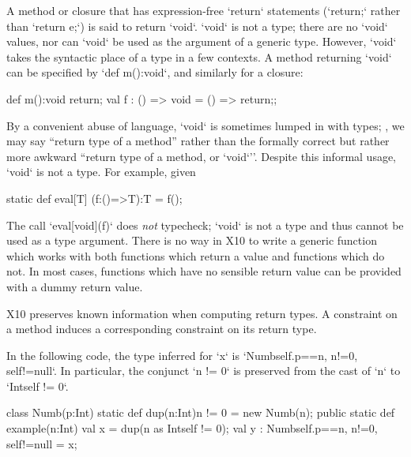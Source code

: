 
A method or closure that has expression-free \xcd`return` statements
(\xcd`return;` rather than \xcd`return e;`) is said to return \xcd`void`.
\xcd`void` is not a type; there are no \xcd`void` values, nor can \xcd`void`
be used as the argument of a generic type. However, \xcd`void` takes the
syntactic place of a type in a few contexts. A method returning \xcd`void` can be specified by
\xcd`def m():void`, and similarly for a closure: 

\begin{xten}
def m():void {return;}
val f : () => void = () => {return;};
\end{xten}

By a convenient abuse of language, \xcd`void` is sometimes
lumped in with types; \eg, we may say ``return type of a method'' rather than
the formally correct but rather more awkward ``return type of a method, or
\xcd`void`''.   Despite this informal usage, \xcd`void` is not a type.  For
example, given 
\begin{xten}
  static def eval[T] (f:()=>T):T = f();
\end{xten}
\noindent
The call \xcd`eval[void](f)` does {\em not} typecheck; \xcd`void` is not a
type and thus cannot be used as a type argument.  There is no way in X10 to
write a generic function which works with both functions which return a value
and functions which do not.  In most cases, functions which have no sensible
return value can be provided with a dummy return value.

X10 preserves known information when computing return types.  
A constraint on a method induces a corresponding constraint on its return
type.  

\begin{ex}
In the following code, the type inferred for \xcd`x`
is \xcd`Numb{self.p==n, n!=0, self!=null}`.  In particular, 
the conjunct \xcd`n != 0` is preserved from the cast of 
    \xcd`n` to \xcd`Int{self != 0}`.
\begin{xten}
class Numb(p:Int){
  static def dup(n:Int){n != 0} = new Numb(n);
  public static def example(n:Int) {
    val x = dup(n as Int{self != 0});
    val y : Numb{self.p==n, n!=0, self!=null} = x;
  }
}
\end{xten}
%

\end{ex}

